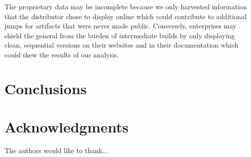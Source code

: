 \documentclass[conference]{IEEEtran}
\begin{document}
 The proprietary data may be incomplete because we only harvested information that the distributor chose to display online which could contribute to additional jumps for artifacts that were never made public. Conversely, enterprises may shield the general from the burden of intermediate builds by only displaying clean, sequential versions on their websites and in their documentation which could skew the results of our analysis.





\section{Conclusions}


\section*{Acknowledgments}

The authors would like to thank...

%

\end{document}
